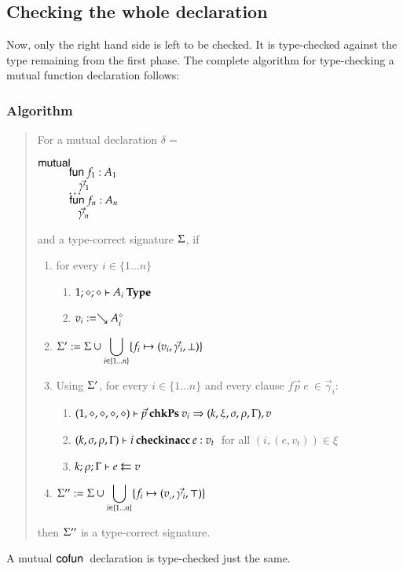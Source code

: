 
\subsection{Checking the whole declaration}

Now, only the right hand side is left to be checked. It is type-checked against the type remaining from the first phase. 
The complete algorithm for type-checking a mutual function declaration follows: 
\subsubsection{Algorithm}
\begin{quote}
For a mutual declaration $\delta = $ 
\begin{bsp}
$\mutual$\\
$\spcx \fun f_1 : A_1 $\\
$\spcx \spc \vec{\gamma}_1$\\
$\spcx \ldots$\\
$\spcx \fun f_n : A_n $\\
$\spcx \spc \vec{\gamma}_n$
\end{bsp}
and a type-correct signature $\Sig$, if 
\begin{enumerate}
\item
for every $i \in \{1 \ldots n \} $
\begin{enumerate}
\item
$\IsType{1}{\diamond}{\diamond}{A_i}$
\item
$v_{i} := \wh \cl{A_i}{\diamond}$
\end{enumerate}
\item
$\Sig' := \Sig \cup \displaystyle\bigcup_{i \in \{1 \ldots n\}}\{f_i \mapsto (v_{i},\vec{\gamma}_i,\bot)\}$
\item
Using $\Sig'$, for every $i \in \{ 1 \ldots n \} $ and every clause  $ f \vec{p} \: e \: \in \vec{\gamma}_i$:
\begin{enumerate}
\item
$\checkps{1,\diamond,\diamond,\diamond,\diamond}{\vec{p}}{v_i}{k,\xi,\sigma,\rho,\Gamma}{v}$
\item
$\checkinacc{k,\sigma,\rho,\Gamma}{i}{e}{v_t}\: $ for all $(i,(e,v_t)) \in \xi$ 
\item 
$\Check{k}{\rho}{\Gamma}{e}{v}$
\end{enumerate}
\item
$\Sig'' := \Sig \cup \displaystyle\bigcup_{i \in \{1 \ldots n\}} \{f_i \mapsto (v_{_i},\vec{\gamma_i},\top)\}$
\end{enumerate}
then $\Sig''$ is a type-correct signature.
\end{quote}
A mutual $\cofun$ declaration is type-checked just the same.

